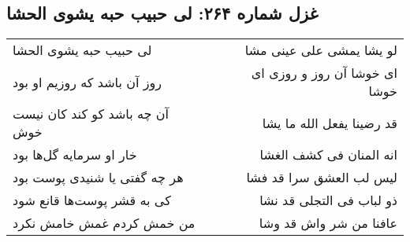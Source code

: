 \begin{center}
\section*{غزل شماره ۲۶۴: لی حبیب حبه یشوی الحشا}
\label{sec:0264}
\begin{longtable}{l p{0.5cm} r}
لی حبیب حبه یشوی الحشا
&&
لو یشا یمشی علی عینی مشا
\\
روز آن باشد که روزیم او بود
&&
ای خوشا آن روز و روزی ای خوشا
\\
آن چه باشد کو کند کان نیست خوش
&&
قد رضینا یفعل الله ما یشا
\\
خار او سرمایه گل‌ها بود
&&
انه المنان فی کشف الغشا
\\
هر چه گفتی یا شنیدی پوست بود
&&
لیس لب العشق سرا قد فشا
\\
کی به قشر پوست‌ها قانع شود
&&
ذو لباب فی التجلی قد نشا
\\
من خمش کردم غمش خامش نکرد
&&
عافنا من شر واش قد وشا
\\
\end{longtable}
\end{center}
